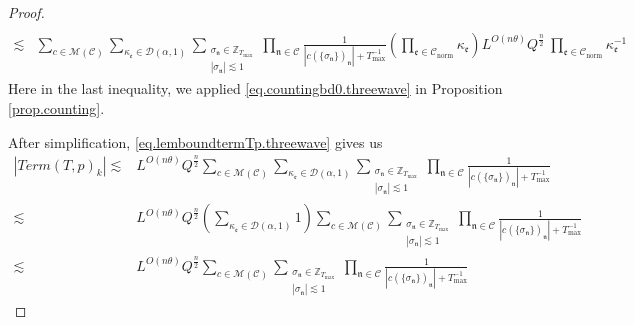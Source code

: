 \begin{proof}
\begin{equation}
\begin{split}
    \\
    \lesssim &\sum_{c\in \mathscr{M}(\mathcal{C}) }\sum_{\kappa_{\mathfrak{e}}\in \mathcal{D}(\alpha,1)}\sum_{\substack{\sigma_{\mathfrak{n}}\in \mathbb{Z}_{T_{\text{max}}}\\ |\sigma_{\mathfrak{n}}|\lesssim 1}}\prod_{\mathfrak{n}\in \mathcal{C}}\frac{1}{|c(\{\sigma_{\mathfrak{n}}\})_{\mathfrak{n}}|+T^{-1}_{\text{max}}} \left(\prod_{\mathfrak{e}\in \mathcal{C}_{\text{norm}}}\kappa_{\mathfrak{e}}\right)L^{O(n\theta)} Q^{\frac{n}{2}}\ \prod_{\mathfrak{e}\in \mathcal{C}_{\text{norm}}} \kappa^{-1}_{\mathfrak{e}}
\end{split}
\end{equation}
Here in the last inequality, we applied \eqref{eq.countingbd0.threewave} in Proposition \ref{prop.counting}.

After simplification, \eqref{eq.lemboundtermTp.threewave} gives us 
\begin{equation}\label{eq.lemboundtermTpsimplify.threewave}
\begin{split}
    |Term(T, p)_k|\lesssim &L^{O(n\theta)} Q^{\frac{n}{2}}\sum_{c\in \mathscr{M}(\mathcal{C}) }\sum_{\kappa_{\mathfrak{e}}\in \mathcal{D}(\alpha,1)}\sum_{\substack{\sigma_{\mathfrak{n}}\in \mathbb{Z}_{T_{\text{max}}}\\ |\sigma_{\mathfrak{n}}|\lesssim 1}} \prod_{\mathfrak{n}\in \mathcal{C}}\frac{1}{|c(\{\sigma_{\mathfrak{n}}\})_{\mathfrak{n}}|+T^{-1}_{\text{max}}}
    \\
    \lesssim &L^{O(n\theta)} Q^{\frac{n}{2}} \left(\sum_{\kappa_{\mathfrak{e}}\in \mathcal{D}(\alpha,1)} 1\right) \sum_{c\in \mathscr{M}(\mathcal{C})}\sum_{\substack{\sigma_{\mathfrak{n}}\in \mathbb{Z}_{T_{\text{max}}}\\ |\sigma_{\mathfrak{n}}|\lesssim 1}} \prod_{\mathfrak{n}\in \mathcal{C}}\frac{1}{|c(\{\sigma_{\mathfrak{n}}\})_{\mathfrak{n}}|+T^{-1}_{\text{max}}}
    \\
    \lesssim & L^{O(n\theta)} Q^{\frac{n}{2}} \sum_{c\in \mathscr{M}(\mathcal{C})}\sum_{\substack{\sigma_{\mathfrak{n}}\in \mathbb{Z}_{T_{\text{max}}}\\ |\sigma_{\mathfrak{n}}|\lesssim 1}} \prod_{\mathfrak{n}\in \mathcal{C}}\frac{1}{|c(\{\sigma_{\mathfrak{n}}\})_{\mathfrak{n}}|+T^{-1}_{\text{max}}}
\end{split}
\end{equation}

\end{proof}

